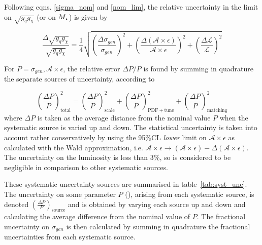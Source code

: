 Following eqns. \ref{sigma_nom} and \ref{nom_lim}, the relative uncertainty in the limit on $\sqrt{g_q g_{\chi}}$ (or on $M_{\star}$) is given by

\begin{equation}
\label{unc_lim}
\frac{\Delta \sqrt{g_q g_{\chi}}}{\sqrt{g_q g_{\chi}}} = \frac{1}{4} \sqrt{\left( \frac{\Delta \sigma_{gen}}{\sigma_{gen}} \right)^2 + \left( \frac{\Delta (\mathcal{A} \times \epsilon)}{\mathcal{A} \times \epsilon} \right)^2 + \left( \frac{\Delta \mathcal{L}}{\mathcal{L}} \right)^2}
\end{equation}

For $P = \sigma_{gen}, \mathcal{A} \times \epsilon$, the relative error $\Delta P / P$ is found by summing in quadrature the separate sources of uncertainty, according to

\begin{equation}
\label{unc_P}
\left ( \frac{\Delta P}{P} \right )^2_{\mathrm{total}} = \left ( \frac{\Delta P}{P} \right )^2_{\mathrm{scale}} + \left ( \frac{\Delta P}{P} \right )^2_{\mathrm{PDF+tune}} + \left ( \frac{\Delta P}{P} \right )^2_{\mathrm{matching}}
\end{equation}
where $\Delta P$ is taken as the average distance from the nominal value $P$ when the systematic source is varied up and down. The statistical uncertainty is taken into account rather conservatively by using the 95\%CL \emph{lower} limit on $\mathcal{A} \times \epsilon$ as calculated with the Wald approximation, i.e. $\mathcal{A} \times \epsilon \rightarrow (\mathcal{A} \times \epsilon) - \Delta(\mathcal{A} \times \epsilon)$. The uncertainty on the luminosity is less than 3\%, so is considered to be negligible in comparison to other systematic sources.

\bigskip
\bigskip


These systematic uncertainty sources are summarised in table~\ref{tab:syst_unc}. The uncertainty on some parameter $P$ (), arising from each systematic source, is denoted $\left ( \frac{\Delta P}{P} \right)_{\mathrm{source}}$ and is obtained by varying each source up and down and calculating the average difference from the nominal value of $P$. The fractional uncertainty on $\sigma_{gen}$ is then calculated by summing in quadrature the fractional uncertainties from each systematic source.

